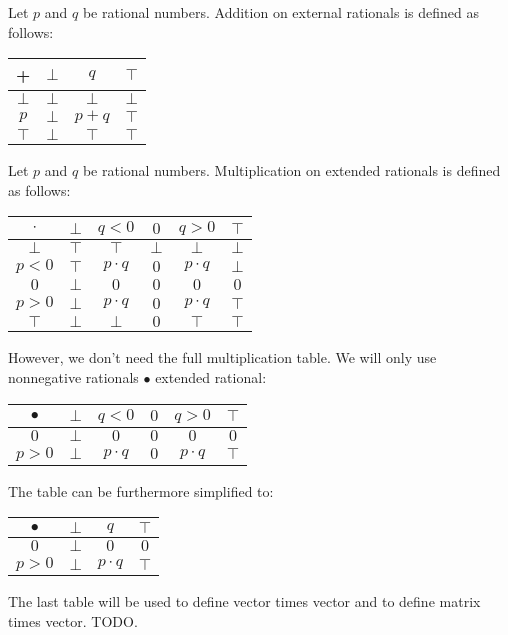 \documentclass[]{article}
\begin{document}
Let $p$ and $q$ be rational numbers.
Addition on external rationals is defined as follows:
\begin{center}
	\begin{tabular}{ c || c | c | c | }
		+ & $\bot$ & $q$ & $\top$  \\
		\hline\hline
		$\bot$ & $\bot$ & $\bot$ & $\bot$  \\ 
		\hline
		$p$ & $\bot$ & $p\!+\!q$ & $\top$  \\ 
		\hline
		$\top$ & $\bot$ & $\top$ & $\top$ \\ 
		\hline
	\end{tabular}
\end{center}
Let $p$ and $q$ be rational numbers.
Multiplication on extended rationals is defined as follows:
\begin{center}
	\begin{tabular}{ c || c | c | c | c | c | }
		$\cdot$ & $\bot$ & $q<0$ & $0$ & $q>0$ & $\top$  \\
		\hline\hline
		$\bot$ & $\top$ & $\top$ & $\bot$ & $\bot$ & $\bot$  \\ 
		\hline
		$p<0$ & $\top$ & $p \cdot q$ & $0$ & $p \cdot q$ & $\bot$  \\ 
		\hline
		$0$ & $\bot$ & $0$ & $0$ & $0$ & $0$  \\ 
		\hline
		$p>0$ & $\bot$ & $p \cdot q$ & $0$ & $p \cdot q$ & $\top$  \\ 
		\hline
		$\top$ & $\bot$ & $\bot$ & $0$ & $\top$ & $\top$ \\ 
		\hline
	\end{tabular}
\end{center}
However, we don't need the full multiplication table.
We will only use nonnegative rationals $\bullet$ extended rational:
\begin{center}
	\begin{tabular}{ c || c | c | c | c | c | }
		$\bullet$ & $\bot$ & $q<0$ & $0$ & $q>0$ & $\top$  \\
		\hline\hline
		$0$ & $\bot$ & $0$ & $0$ & $0$ & $0$  \\ 
		\hline
		$p>0$ & $\bot$ & $p \cdot q$ & $0$ & $p \cdot q$ & $\top$  \\ 
		\hline
	\end{tabular}
\end{center}
The table can be furthermore simplified to:
\begin{center}
\begin{tabular}{ c || c | c | c | }
	$\bullet$ & $\bot$ & $q$ & $\top$  \\
	\hline\hline
	$0$ & $\bot$ & $0$ & $0$  \\ 
	\hline
	$p>0$ & $\bot$ & $p \cdot q$ & $\top$  \\ 
	\hline
\end{tabular}
\end{center}
The last table will be used to define vector times vector and to define
matrix times vector.
TODO.
\end{document}
